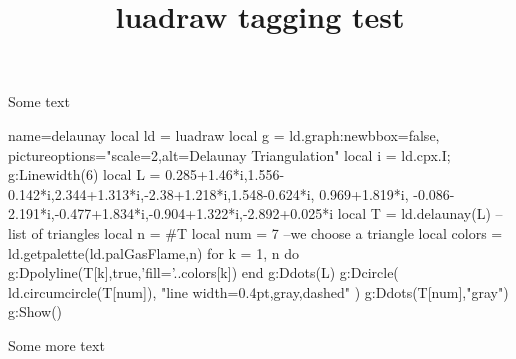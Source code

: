 \documentclass{article}
\title{luadraw tagging test}
\begin{document}
Some text
\begin{luadraw}{name=delaunay}
local ld = luadraw
local g = ld.graph:new{bbox=false, pictureoptions="scale=2,alt=Delaunay Triangulation"}
local i = ld.cpx.I; g:Linewidth(6)
local L = {0.285+1.46*i,1.556-0.142*i,2.344+1.313*i,-2.38+1.218*i,1.548-0.624*i,
0.969+1.819*i, -0.086-2.191*i,-0.477+1.834*i,-0.904+1.322*i,-2.892+0.025*i}
local T = ld.delaunay(L) -- list of triangles
local n = #T
local num = 7 --we choose a triangle
local colors = ld.getpalette(ld.palGasFlame,n)
for k = 1, n do
g:Dpolyline(T[k],true,'fill='..colors[k])
end
g:Ddots(L)
g:Dcircle( {ld.circumcircle(T[num])}, "line width=0.4pt,gray,dashed" )
g:Ddots(T[num],"gray")
g:Show()
\end{luadraw}

Some more text
\end{document}
